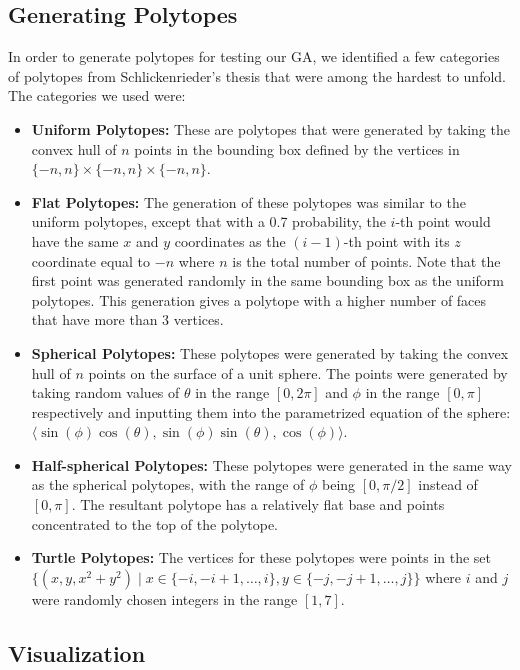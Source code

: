 \documentclass[conference]{IEEEtran}
\begin{document}
\subsection{Generating Polytopes}

In order to generate polytopes for testing our GA, we identified a few categories of polytopes from Schlickenrieder's thesis \cite{schlickenriederNetsPolyhedra} that were among the hardest to unfold. The categories we used were:
\begin{itemize}
    \item \textbf{Uniform Polytopes:} These are polytopes that were generated by taking the convex hull of $n$ points in the bounding box defined by the vertices in $\{-n, n\} \times \{-n, n\} \times \{-n, n\}$. 
    \item \textbf{Flat Polytopes:} The generation of these polytopes was similar to the uniform polytopes, except that with a 0.7 probability, the $i$-th point would have the same $x$ and $y$ coordinates as the $(i-1)$-th point with its $z$ coordinate equal to $-n$ where $n$ is the total number of points. Note that the first point was generated randomly in the same bounding box as the uniform polytopes. This generation gives a polytope with a higher number of faces that have more than 3 vertices.
    \item \textbf{Spherical Polytopes:} These polytopes were generated by taking the convex hull of $n$ points on the surface of a unit sphere. The points were generated by taking random values of $\theta$ in the range $[0, 2\pi]$ and $\phi$ in the range $[0, \pi]$ respectively and inputting them into the parametrized equation of the sphere: $\langle \sin(\phi)\cos(\theta), \sin(\phi)\sin(\theta), \cos(\phi) \rangle$.
    \item \textbf{Half-spherical Polytopes:} These polytopes were generated in the same way as the spherical polytopes, with the range of $\phi$ being $[0, \pi/2]$ instead of $[0, \pi]$. The resultant polytope has a relatively flat base and points concentrated to the top of the polytope.
    \item \textbf{Turtle Polytopes:} The vertices for these polytopes were points in the set $\{(x, y, x^2 + y^2) \mid x \in \{-i, -i + 1, \ldots, i\}, y \in \{-j, -j + 1, \ldots, j\}\}$ where $i$ and $j$ were randomly chosen integers in the range $[1, 7]$. 
\end{itemize}

\subsection{Visualization}
\end{document}
